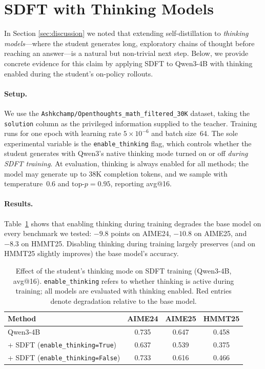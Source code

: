 \section{SDFT with Thinking Models}
\label{app:opsd-thinking}
 
In Section \ref{sec:discussion} we noted that extending self-distillation to \emph{thinking
models}---where the student generates long, exploratory chains of thought
before reaching an answer---is a natural but non-trivial next step.
Below,
we provide concrete evidence for this claim by applying SDFT to
Qwen3-4B with thinking enabled during the student's on-policy
rollouts.
 
\paragraph{Setup.}
We use the \texttt{Ashkchamp/Openthoughts\_math\_filtered\_30K} dataset,
taking the \texttt{solution} column as the privileged information supplied
to the teacher.  Training runs for one epoch with learning rate
$5\!\times\!10^{-6}$ and batch size~64.  The sole experimental variable is
the \texttt{enable\_thinking} flag, which controls whether the student generates with Qwen3's native thinking mode turned on or off
\emph{during SDFT training}.
At evaluation, thinking is always enabled for all methods;
the model may generate up to 38K completion tokens, and we sample with
temperature~$0.6$ and top-$p = 0.95$, reporting avg@16.
 
\paragraph{Results.}
Table~\ref{tab:opsd-thinking} shows that enabling thinking during
training degrades the base model on every benchmark
we tested: $-9.8$ points on AIME24, $-10.8$ on AIME25, and $-8.3$ on
HMMT25.  Disabling thinking during training largely preserves (and on HMMT25 slightly
improves) the base model's accuracy.
 
\begin{table}[h]
\centering
\vspace{4pt}
\begin{tabular}{lccc}
\toprule
\textbf{Method} & \textbf{AIME24} & \textbf{AIME25} & \textbf{HMMT25} \\
\midrule
Qwen3-4B  & 0.735 & 0.647 & 0.458 \\
\midrule
\; + SDFT (\texttt{enable\_thinking=True})
  & \textcolor{darkbluegreen}{0.637} & \textcolor{darkbluegreen}{0.539} & \textcolor{darkbluegreen}{0.375} \\
\; + SDFT (\texttt{enable\_thinking=False})
  & 0.733 & 0.616 & 0.466 \\
\bottomrule
\end{tabular}
\caption{%
  Effect of the student's thinking mode on SDFT training
  (Qwen3-4B, avg@16).  \texttt{enable\_thinking} refers to
  whether thinking is active during training; all models are evaluated
  with thinking enabled.  Red entries denote degradation relative
  to the base model.}
\label{tab:opsd-thinking}
\end{table}

